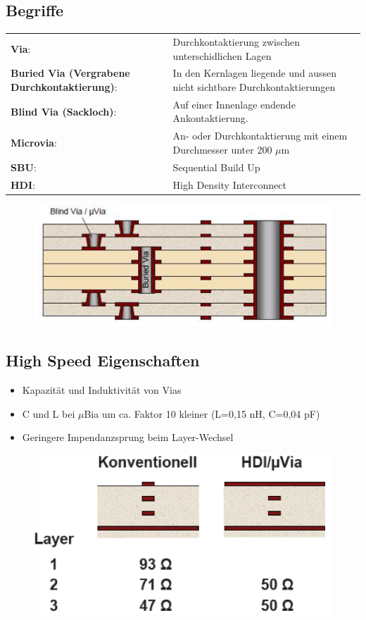 \subsection{Begriffe}
\begin{tabular}{p{4cm}l}
\textbf{Via}:& Durchkontaktierung zwischen unterschidlichen Lagen\\
\textbf{Buried Via (Vergrabene Durchkontaktierung)}: &In den Kernlagen liegende
  und aussen nicht sichtbare Durchkontaktierungen\\
\textbf{Blind Via (Sackloch)}: &Auf einer Innenlage endende Ankontaktierung.\\
\textbf{Microvia}: &An- oder Durchkontaktierung  mit einem Durchmesser unter 200
  $\mu$m\\
\textbf{SBU}:&Sequential Build Up\\
\textbf{HDI}:&High Density Interconnect\\
\end{tabular}
\begin{figure}[htb]
\includegraphics[scale=0.4]{pictures/begriffe}
\end{figure}

\subsection{High Speed Eigenschaften}
\begin{itemize}
  \item Kapazität und Induktivität von Vias
  \item C und L bei $\mu$Bia um ca. Faktor 10 kleiner (L=0,15 nH, C=0,04 pF)
  \item Geringere Impendanzsprung beim Layer-Wechsel
\end{itemize}

\begin{figure}[htb]
\includegraphics[scale=0.4]{pictures/highspeed}
\end{figure}

